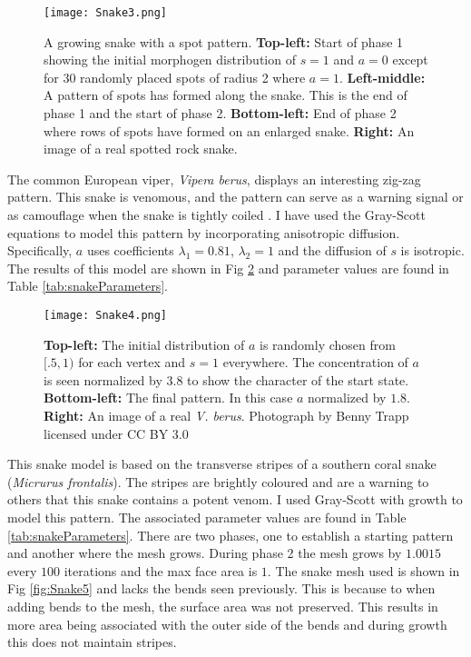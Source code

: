 \begin{figure}[ht]
	\centering
	\texttt{[image: Snake3.png]}
	\caption{A growing snake with a spot pattern. \textbf{Top-left:} Start of phase 1 showing the initial morphogen distribution of $s=1$ and $a=0$ except for 30 randomly placed spots of radius 2 where $a=1$. \textbf{Left-middle:} A pattern of spots has formed along the snake. This is the end of phase 1 and the start of phase 2. \textbf{Bottom-left:} End of phase 2 where rows of spots have formed on an enlarged snake. \textbf{Right:} An image of a real spotted rock snake.}
	\label{fig:Snake3}
\end{figure}

The common European viper, \textit{Vipera berus}, displays an interesting zig-zag pattern. This snake is venomous,   and the pattern can serve as a warning signal or as camouflage when the snake is tightly coiled \cite{lillywhite2014}. I have used the Gray-Scott equations to model this pattern by incorporating anisotropic diffusion. Specifically, $a$ uses coefficients $\lambda_{1}=0.81$, $\lambda_{2}=1$ and the diffusion of $s$ is isotropic. The results of this model are shown in Fig \ref{fig:Snake4} and parameter values are found in Table \ref{tab:snakeParameters}.

\newpage 

\begin{figure}[ht]
	\centering
	\texttt{[image: Snake4.png]}
	\caption{\textbf{Top-left:} The initial distribution of $a$ is randomly chosen from $[.5, 1)$ for each vertex and $s=1$ everywhere. The concentration of $a$ is seen normalized by 3.8 to show the character of the start state. \textbf{Bottom-left:} The final pattern. In this case $a$ normalized by $1.8$. \textbf{Right:} An image of a real \textit{V. berus}. Photograph by Benny Trapp licensed under CC BY 3.0}
	\label{fig:Snake4}
\end{figure}

This snake model is based on the transverse stripes of a southern coral snake (\textit{Micrurus frontalis}). The stripes are brightly coloured and are a warning to others that this snake contains a potent venom. I used Gray-Scott with growth to model this pattern. The associated parameter values are found in Table \ref{tab:snakeParameters}. There are two phases, one to establish a starting pattern and another where the mesh grows. During phase 2 the mesh grows by $1.0015$ every $100$ iterations and the max face area is $1$. The snake mesh used is shown in Fig \ref{fig:Snake5} and lacks the bends seen previously. This is because to when adding bends to the mesh, the surface area was not preserved. This results in more area being associated with the outer side of the bends and during growth this does not maintain stripes.

